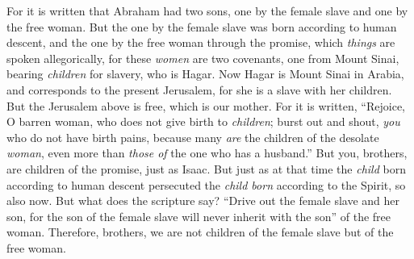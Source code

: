 \begin{biblechapter}
\verse For it is written that Abraham had two sons, one by the female slave and one by the free woman.
\verse But the one by the female slave was born according to human descent, and the one by the free woman through the promise,
\verse which \textit{things} are spoken allegorically, for these \textit{women} are two covenants, one from Mount Sinai, bearing \textit{children} for slavery, who is Hagar.
\verse Now Hagar is Mount Sinai in Arabia, and corresponds to the present Jerusalem, for she is a slave with her children.
\verse But the Jerusalem above is free, which is our mother.
\verse For it is written, “Rejoice, O barren woman, who does not give birth to \textit{children}; 
burst out and shout, \textit{you} who do not have birth pains, 
because many \textit{are} the children of the desolate \textit{woman}, 
even more than \textit{those of} the one who has a husband.”
\verse But you, brothers, are children of the promise, just as Isaac.
\verse But just as at that time the \textit{child} born according to human descent persecuted the \textit{child born} according to the Spirit, so also now.
\verse But what does the scripture say? “Drive out the female slave and her son, for the son of the female slave will never inherit with the son” of the free woman.
\verse Therefore, brothers, we are not children of the female slave but of the free woman.
\end{biblechapter}

